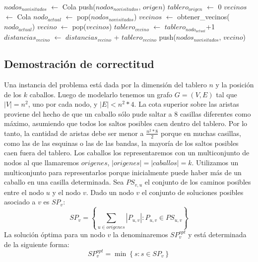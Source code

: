 \begin{algorithm}[H]
  \begin{algorithmic}
    \STATE $nodos_{no visitados}$ $\gets$ Cola
    \STATE push($nodos_{no visitados}$, $origen$)
    \STATE $tablero_{origen}$ $\gets$ 0
    \STATE $vecinos$ $\gets$ Cola
      \STATE $nodo_{actual}$ $\gets$ pop($nodos_{no visitados}$)
      \STATE $vecinos$ $\gets$ obtener\_vecinos($nodo_{actual}$)
        \STATE $vecino$ $\gets$ pop($vecinos$)
          \STATE $tablero_{vecino}$ $\gets$ $tablero_{nodo_{actual}}$+1
          \STATE $distancias_{vecino}$ $\gets$ $distancias_{vecino}$ + $tablero_{vecino}$
          \STATE push($nodos_{no visitados}$, $vecino$)
        \ENDIF
      \ENDWHILE
    \ENDWHILE
  \end{algorithmic}
\end{algorithm}

\subsection{Demostración de correctitud}
Una instancia del problema está dada por la dimensión del tablero $n$ y la posición
de los $k$ caballos. Luego de modelarlo tenemos un grafo $G = (V, E)$ tal que $\left\vert{V}\right\vert = n^2$, uno
por cada nodo, y $\left\vert{E}\right\vert < n^2 * 4$. La cota superior sobre las aristas proviene del hecho de que
un caballo sólo pude saltar a 8 casillas diferentes como máximo, asumiendo que todos los
saltos posibles caen dentro del tablero. Por lo tanto, la cantidad de aristas debe ser menor
a $\frac{n^2 * 8}{2}$ porque en muchas casillas, como las de las esquinas o las de las bandas, la
mayoría de los saltos posibles caen fuera del tablero. Los caballos los representaremos con un multiconjunto
de nodos al que llamaremos $origenes$, $\left\vert{origenes}\right\vert = \left\vert{caballos}\right\vert = k$. Utilizamos un multiconjunto 
para representarlos porque inicialmente puede haber más de un caballo en una casilla determinada.
Sea $PS_{v,u}$ el conjunto de los caminos posibles entre el nodo $u$ y el nodo $v$.
Dado un nodo $v$ el conjunto de soluciones posibles asociado a $v$ es $SP_v$:
\begin{displaymath}
  SP_v = \left\{ { \sum_{u \in origenes} \left\vert{P_{u,v}}\right\vert : P_{u, v} \in PS_{u, v}} \right\}
\end{displaymath}
La solución óptima para un nodo $v$ la denominaremos $SP_v^{opt}$ y está determinada de la siguiente forma:
\begin{displaymath}
  SP_v^{opt} = \min \left\{ {s : s \in SP_v} \right\} 
\end{displaymath}

